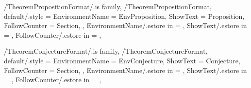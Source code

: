 \newcommand{\InitTheoremCorollaryFormat}
{%
  \theoremstyle{plain}%
  \ifthenelse{\equal{\GetTheoremCorollaryFormatFollowCounter}{\empty}}%
  {%
    \newtheorem{%
      \GetTheoremCorollaryFormatEnvironmentName}{%
      \GetTheoremCorollaryFormatShowText}%
  }%
  {%
    \MappingTheoremCounter[Corollary]{\GetTheoremCorollaryFormatFollowCounter}%
    \newtheorem{%
      \GetTheoremCorollaryFormatEnvironmentName}{%
      \GetTheoremCorollaryFormatShowText}[%
      \GetTheoremCorollaryFormatFollowCounter]%
  }%
} %


\pgfkeys
{
  /TheoremPropositionFormat/.is family, /TheoremPropositionFormat,
  default/.style =
  {
    EnvironmentName = {EnvProposition},
    ShowText = {Proposition},
    FollowCounter = Section,
  },
  EnvironmentName/.estore in = \GetTheoremPropositionFormatEnvironmentName,
  ShowText/.estore in = \GetTheoremPropositionFormatShowText,
  FollowCounter/.estore in = \GetTheoremPropositionFormatFollowCounter,
} %

\newcommand{\InsertProposition}[2][\empty]
{%
  \InsertTheoremContent[#1]{\GetTheoremPropositionFormatEnvironmentName}{#2}%
} %

\newcommand{\InitTheoremPropositionFormat}
{%
  \theoremstyle{plain}%
  \ifthenelse{\equal{\GetTheoremPropositionFormatFollowCounter}{\empty}}%
  {%
    \newtheorem{%
      \GetTheoremPropositionFormatEnvironmentName}{%
      \GetTheoremPropositionFormatShowText}%
  }%
  {%
    \MappingTheoremCounter[Proposition]{\GetTheoremPropositionFormatFollowCounter}%
    \newtheorem{%
      \GetTheoremPropositionFormatEnvironmentName}{%
      \GetTheoremPropositionFormatShowText}[%
      \GetTheoremPropositionFormatFollowCounter]%
  }%
} %


\pgfkeys
{
  /TheoremConjectureFormat/.is family, /TheoremConjectureFormat,
  default/.style =
  {
    EnvironmentName = {EnvConjecture},
    ShowText = {Conjecture},
    FollowCounter = Section,
  },
  EnvironmentName/.estore in = \GetTheoremConjectureFormatEnvironmentName,
  ShowText/.estore in = \GetTheoremConjectureFormatShowText,
  FollowCounter/.estore in = \GetTheoremConjectureFormatFollowCounter,
} %

\newcommand{\InsertConjecture}[2][\empty]
{%
  \InsertTheoremContent[#1]{\GetTheoremConjectureFormatEnvironmentName}{#2}%
} %

